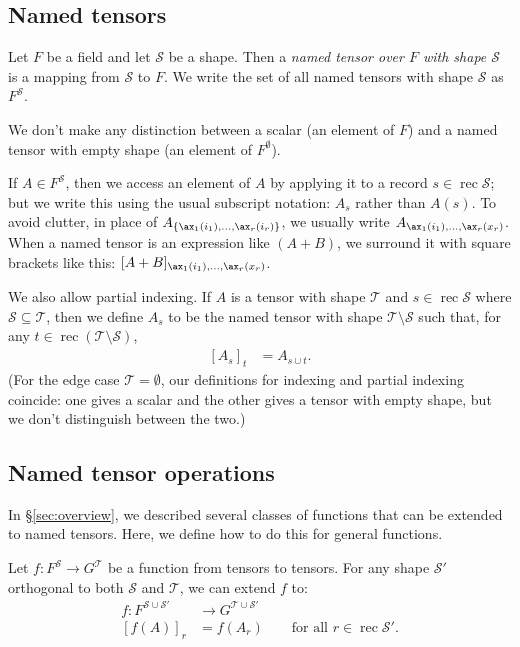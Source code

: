 \documentclass{article}
\DeclareMathOperator{\rec}{rec}
\begin{document}
\subsection{Named tensors}

Let $F$ be a field and let $\mathcal{S}$ be a shape. Then a \emph{named tensor over $F$ with shape $\mathcal{S}$} is a mapping from $\mathcal{S}$ to $F$. We write the set of all named tensors with shape $\mathcal{S}$ as $F^{\mathcal{S}}$.

We don't make any distinction between a scalar (an element of $F$) and a named tensor with empty shape (an element of $F^\emptyset$).

If $A \in F^{\mathcal{S}}$, then we access an element of $A$ by applying it to a record $s \in \rec \mathcal{S}$; but we write this using the usual subscript notation: $A_s$ rather than $A(s)$. To avoid clutter, in place of $A_{\{\ax_1(i_1), \ldots, \ax_r(i_r)\}}$, we usually write $A_{\ax_1(i_1), \ldots, \ax_r(x_r)}$. When a named tensor is an expression like $(A+B)$, we surround it with square brackets like this: $[A+B]_{\ax_1(i_1), \ldots, \ax_r(x_r)}$.

We also allow partial indexing. If $A$ is a tensor with shape $\mathcal{T}$ and $s \in \rec \mathcal{S}$ where $\mathcal{S} \subseteq \mathcal{T}$, then we define $A_s$ to be the named tensor with shape $\mathcal{T} \setminus \mathcal{S}$ such that, for any $t \in \rec (\mathcal{T} \setminus \mathcal{S})$,
\begin{align*}
\left[A_s\right]_t &= A_{s \cup t}.
\end{align*}
(For the edge case $\mathcal{T} = \emptyset$, our definitions for indexing and partial indexing coincide: one gives a scalar and the other gives a tensor with empty shape, but we don't distinguish between the two.)

\subsection{Named tensor operations}
\label{sec:tensorfunctions}

In \S\ref{sec:overview}, we described several classes of functions that can be extended to named tensors. Here, we define how to do this for general functions.

Let $f \colon F^{\mathcal{S}} \rightarrow G^{\mathcal{T}}$ be a function from tensors to tensors. For any shape $\mathcal{S'}$ orthogonal to both $\mathcal{S}$ and $\mathcal{T}$, we can extend $f$ to:
\begin{align*}
f \colon F^{\mathcal{S} \cup \mathcal{S'}} &\rightarrow G^{\mathcal{T} \cup \mathcal{S'}} \\
[f(A)]_r &= f(A_r) \qquad \text{for all $r \in \rec\mathcal{S'}$.}
\end{align*}
\end{document}
